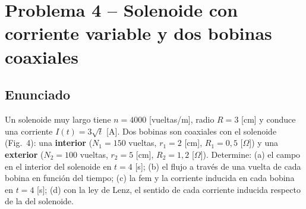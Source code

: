 \documentclass[12pt,letterpaper]{article}
\begin{document}
\newpage
\section*{Problema 4 -- Solenoide con corriente variable y dos bobinas coaxiales}

\subsection*{Enunciado}

Un solenoide muy largo tiene $n = 4000$ [vueltas/m], radio $R = 3$ [cm] y conduce una corriente
$I(t) = 3\sqrt{t}$ [A]. Dos bobinas son coaxiales con el solenoide (Fig.\ 4): una
\textbf{interior} ($N_1 = 150$ vueltas, $r_1 = 2$ [cm], $R_1 = 0{,}5$ [$\Omega$]) y una
\textbf{exterior} ($N_2 = 100$ vueltas, $r_2 = 5$ [cm], $R_2 = 1{,}2$ [$\Omega$]). Determine:
(a) el campo en el interior del solenoide en $t = 4$ [s]; (b) el flujo a trav\'es de una vuelta de
cada bobina en funci\'on del tiempo; (c) la fem y la corriente inducida en cada bobina en $t = 4$ [s];
(d) con la ley de Lenz, el sentido de cada corriente inducida respecto de la del solenoide.
\end{document}
